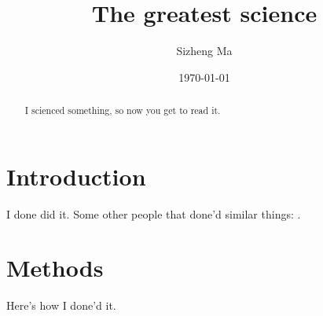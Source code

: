 \documentclass[aps,prd,amsmath,floats,floatfix, twocolumn,
superscriptaddress,nofootinbib,showpacs,longbibliography]{revtex4-1}
\begin{document}
\title{The greatest science}

\newcommand{\AEI}{\affiliation{Max Planck Institute for Gravitational Physics
(Albert Einstein Institute), D-14476 Potsdam, Germany}}
\newcommand{\UMassD}{\affiliation{Department of Mathematics,
    Center for Scientific Computing and Data Science Research,
    University of Massachusetts, Dartmouth, MA 02747, USA}}
\newcommand{\Cornell}{\affiliation{Cornell Center for Astrophysics
    and Planetary Science, Cornell University, Ithaca, New York 14853, USA}}
\newcommand\CornellPhys{\affiliation{Department of Physics, Cornell
    University, Ithaca, New York 14853, USA}}
\newcommand\Caltech{\affiliation{TAPIR 350-17, California Institute of
    Technology, 1200 E California Boulevard, Pasadena, CA 91125, USA}}
\newcommand\Olemiss{\affiliation{Department of Physics and Astronomy,
    The University of Mississippi, University, MS 38677, USA}}

\author{Sizheng Ma}
\caltech


\date{\today}

\begin{abstract}
I scienced something, so now you get to read it.
\end{abstract}

\maketitle

\section{Introduction}
\label{sec:introduction}
I done did it. Some other people that done'd similar things:
\cite{Scott:2015rza}.

\section{Methods}
\label{sec:methods}
Here's how I done'd it.
\end{document}
